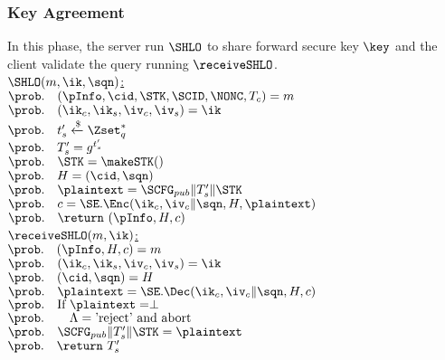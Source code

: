 \subsubsection{Key Agreement}
In this phase, the server run $\SHLO$ to share forward
secure key $\key$ and the client validate the query running
$\receiveSHLO$.
\\
\noindent
\underline{$\SHLO(m, \ik, \sqn)$:} \\
 \setcounter{nombre}{0}%
 $\prob.\quad (\pInfo, \cid, \STK, \SCID, \NONC, T_c) = m$ \\
 $\prob.\quad (\ik_c, \ik_s, \iv_c, \iv_s) = \ik$ \\
 $\prob.\quad t_s^{\prime} \xleftarrow{\$} \Zset_{q}^{\ast}$ \\
 $\prob.\quad T_s^{\prime} = g^{t_s^{\prime}}$ \\
 $\prob.\quad \STK = \makeSTK()$ \\
 $\prob.\quad H = (\cid, \sqn)$ \\
 $\prob.\quad \plaintext = \SCFG_{pub} \| T_s^{\prime} \| \STK $\\
 $\prob.\quad c = \SE.\Enc(\ik_c, \iv_c \| \sqn, H, \plaintext)$ \\
 $\prob.\quad \return\ (\pInfo, H, c)$ \\
\underline{$\receiveSHLO(m, \ik)$:} \\
 \setcounter{nombre}{0}%
 $\prob.\quad (\pInfo, H, c) = m$ \\
 $\prob.\quad (\ik_c, \ik_s, \iv_c, \iv_s) = \ik$ \\
 $\prob.\quad (\cid, \sqn) = H$ \\
 $\prob.\quad \plaintext = \SE.\Dec(\ik_c, \iv_c \| \sqn, H, c)$ \\
 $\prob.\quad \text{If }\plaintext = \perp$ \\
 $\prob.\quad \quad \Lambda = \text{'reject' and abort}$ \\
 $\prob.\quad \SCFG_{pub} \| T_s^{\prime} \| \STK  = \plaintext $ \\
 $\prob.\quad \return\ T_s^{\prime}$ \\